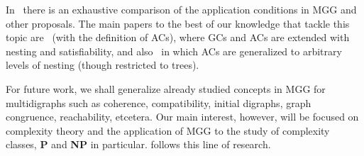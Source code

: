 \documentclass{fundam}
\begin{document}
In~\cite{MGGfundamenta} there is an exhaustive comparison of the
application conditions in MGG and other proposals. The main papers to
the best of our knowledge that tackle this topic are~\cite{AC:Ehrig}
(with the definition of ACs), \cite{Habel, HP09} where GCs and ACs are
extended with nesting and satisfiability, and also~\cite{Rensink} in
which ACs are generalized to arbitrary levels of nesting (though
restricted to trees).

For future work, we shall generalize already studied concepts in MGG
for multidigraphs such as coherence, compatibility, initial digraphs,
graph congruence, reachability, etcetera. Our main interest, however,
will be focused on complexity theory and the application of MGG to the
study of complexity classes, \textbf{P} and \textbf{NP} in
particular. \cite{MGGmodel} follows this line of research.
\end{document}
